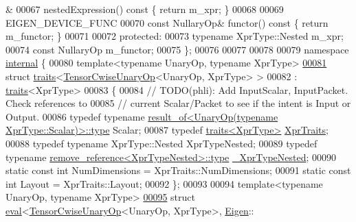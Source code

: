 \begin{DoxyCode}
      &
00067     nestedExpression()\textcolor{keyword}{ const }\{ \textcolor{keywordflow}{return} m\_xpr; \}
00068 
00069     EIGEN\_DEVICE\_FUNC
00070     \textcolor{keyword}{const} NullaryOp& functor()\textcolor{keyword}{ const }\{ \textcolor{keywordflow}{return} m\_functor; \}
00071 
00072   \textcolor{keyword}{protected}:
00073     \textcolor{keyword}{typename} XprType::Nested m\_xpr;
00074     \textcolor{keyword}{const} NullaryOp m\_functor;
00075 \};
00076 
00077 
00078 
00079 \textcolor{keyword}{namespace }\hyperlink{namespaceinternal}{internal} \{
00080 \textcolor{keyword}{template}<\textcolor{keyword}{typename} UnaryOp, \textcolor{keyword}{typename} XprType>
\hyperlink{struct_eigen_1_1internal_1_1traits_3_01_tensor_cwise_unary_op_3_01_unary_op_00_01_xpr_type_01_4_01_4}{00081} \textcolor{keyword}{struct }\hyperlink{struct_eigen_1_1internal_1_1traits}{traits}<\hyperlink{class_eigen_1_1_tensor_cwise_unary_op}{TensorCwiseUnaryOp}<UnaryOp, XprType> >
00082     : \hyperlink{struct_eigen_1_1internal_1_1traits}{traits}<XprType>
00083 \{
00084   \textcolor{comment}{// TODO(phli): Add InputScalar, InputPacket.  Check references to}
00085   \textcolor{comment}{// current Scalar/Packet to see if the intent is Input or Output.}
00086   \textcolor{keyword}{typedef} \textcolor{keyword}{typename} \hyperlink{struct_eigen_1_1internal_1_1result__of}{result\_of<UnaryOp(typename XprType::Scalar)>::type}
       Scalar;
00087   \textcolor{keyword}{typedef} \hyperlink{struct_eigen_1_1internal_1_1traits}{traits<XprType>} \hyperlink{struct_eigen_1_1internal_1_1traits}{XprTraits};
00088   \textcolor{keyword}{typedef} \textcolor{keyword}{typename} XprType::Nested XprTypeNested;
00089   \textcolor{keyword}{typedef} \textcolor{keyword}{typename} \hyperlink{group___sparse_core___module}{remove\_reference<XprTypeNested>::type} 
      \hyperlink{group___sparse_core___module}{\_XprTypeNested};
00090   \textcolor{keyword}{static} \textcolor{keyword}{const} \textcolor{keywordtype}{int} NumDimensions = XprTraits::NumDimensions;
00091   \textcolor{keyword}{static} \textcolor{keyword}{const} \textcolor{keywordtype}{int} Layout = XprTraits::Layout;
00092 \};
00093 
00094 \textcolor{keyword}{template}<\textcolor{keyword}{typename} UnaryOp, \textcolor{keyword}{typename} XprType>
\hyperlink{struct_eigen_1_1internal_1_1eval_3_01_tensor_cwise_unary_op_3_01_unary_op_00_01_xpr_type_01_4_00_01_eigen_1_1_dense_01_4}{00095} \textcolor{keyword}{struct }\hyperlink{struct_eigen_1_1internal_1_1eval}{eval}<\hyperlink{class_eigen_1_1_tensor_cwise_unary_op}{TensorCwiseUnaryOp}<UnaryOp, XprType>, \hyperlink{namespace_eigen}{Eigen}::

\end{DoxyCode}

